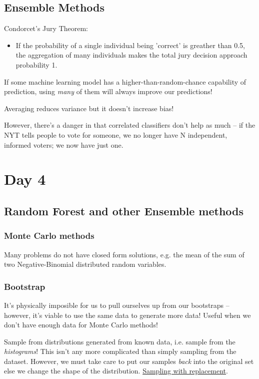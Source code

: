 \documentclass[11pt]{article}
\begin{document}
\begin{itemize}
\subsection{Ensemble Methods}
\label{sec-4-5}
Condorcet's Jury Theorem:
\begin{itemize}
\item If the probability of a single individual being 'correct' is greather than 0.5, the aggregation of many individuals makes the total jury decision approach probability 1.
\end{itemize}

If some machine learning model has a higher-than-random-chance capability of prediction, using \emph{many} of them will always improve our predictions!

Averaging reduces variance but it doesn't increase bias!

However, there's a danger in that correlated classifiers don't help as much -- if the NYT tells people to vote for someone, we no longer have N independent, informed voters; we now have just one.

\section*{Day 4}
\label{sec-5}
\subsection{Random Forest and other Ensemble methods}
\label{sec-5-1}
\subsubsection*{Monte Carlo methods}
\label{sec-5-1-1}
Many problems do not have closed form solutions, e.g. the mean of the sum of two Negative-Binomial distributed random variables.
\subsubsection*{Bootstrap}
\label{sec-5-1-2}
It's physically imposible for us to pull ourselves up from our bootstraps -- however, it's viable to use the same data to generate more data! Useful when we don't have enough data for Monte Carlo methods!

Sample from distributions generated from known data, i.e. sample from the \emph{histograms}! This isn't any more complicated than simply sampling from the dataset. However, we must take care to put our samples \emph{back} into the original set else we change the shape of the distribution. \uline{Sampling with replacement}.


\end{itemize}
\end{document}
